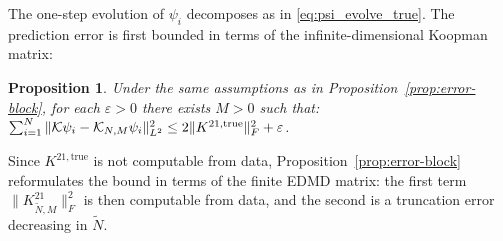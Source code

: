 \documentclass{article}
\theoremstyle{plain}
\newtheorem{proposition}[theorem]{Proposition}
\theoremstyle{definition}
\def\Koop{\mathcal{K}}
\newcommand{\arXivtag}[1][]{#1}
\begin{document}
The one-step evolution of $\psi_i$ decomposes as in \eqref{eq:psi_evolve_true}. The prediction error is first bounded in terms of the infinite-dimensional Koopman matrix:

\begin{proposition}\label{prop:error-bound}
	Under the same assumptions as in Proposition~\ref{prop:error-block}, for each $\varepsilon > 0$ there exists $M > 0$ such that:
	$\sum_{i=1}^N \|\Koop\psi_i - \Koop_{N,M}\psi_i\|_{L^2}^2 \leq 2\|K^{21, \arXivtag[\textnormal{true}]}\|_F^2 + \varepsilon$.
\end{proposition}

Since $K^{21, \text{true}}$ is not computable from data, Proposition~\ref{prop:error-block} reformulates the bound in terms of the finite EDMD matrix: the first term $\|K_{\tilde{N},M}^{21}\|_F^2$ is then computable from data, and the second is a truncation error decreasing in $\tilde{N}$.
\end{document}
